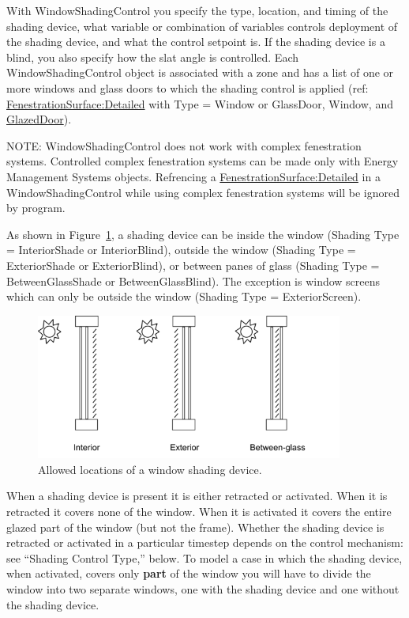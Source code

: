 With WindowShadingControl you specify the type,  location, and timing of the shading device, what variable or combination of variables controls deployment of the shading device, and what the control setpoint is. If the shading device is a blind, you also specify how the slat angle is controlled. Each WindowShadingControl object is associated with a zone and has a list of one or more windows and glass doors to which the shading control is applied (ref: \hyperref[fenestrationsurfacedetailed]{FenestrationSurface:Detailed} with Type = Window or GlassDoor, Window, and \hyperref[glazeddoor]{GlazedDoor}).

NOTE: WindowShadingControl does not work with complex fenestration systems. Controlled complex fenestration systems can be made only with Energy Management Systems objects. Refrencing a \hyperref[fenestrationsurfacedetailed]{FenestrationSurface:Detailed} in a WindowShadingControl while using complex fenestration systems will be ignored by program.

As shown in Figure~\ref{fig:allowed-locations-of-a-window-shading-device.}, a shading device can be inside the window (Shading Type = InteriorShade or InteriorBlind), outside the window (Shading Type = ExteriorShade or ExteriorBlind), or between panes of glass (Shading Type = BetweenGlassShade or BetweenGlassBlind). The exception is window screens which can only be outside the window (Shading Type = ExteriorScreen).

\begin{figure}[hbtp] %
\centering
\includegraphics[width=0.9\textwidth, height=0.9\textheight, keepaspectratio=true]{media/image060.png}
\caption{Allowed locations of a window shading device. \protect \label{fig:allowed-locations-of-a-window-shading-device.}}
\end{figure}

When a shading device is present it is either retracted or activated. When it is retracted it covers none of the window. When it is activated it covers the entire glazed part of the window (but not the frame). Whether the shading device is retracted or activated in a particular timestep depends on the control mechanism: see ``Shading Control Type,'' below. To model a case in which the shading device, when activated, covers only \textbf{part} of the window you will have to divide the window into two separate windows, one with the shading device and one without the shading device.


